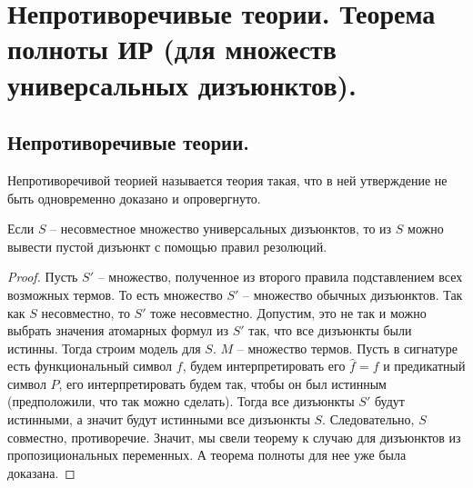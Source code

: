 \section{Непротиворечивые теории. Теорема полноты ИР (для множеств универсальных дизъюнктов).}

\subsection{Непротиворечивые теории.}

\begin{definition}
  Непротиворечивой теорией называется теория такая, что в ней утверждение не быть одновременно доказано и опровергнуто.
\end{definition}

\begin{theorem}
  Если $S$ -- несовместное множество универсальных дизъюнктов, то из $S$ можно вывести пустой дизъюнкт с помощью правил резолюций.
  \begin{proof}
    Пусть $S'$ -- множество, полученное из второго правила подставлением всех возможных термов. То есть множество $S'$ -- множество обычных дизъюнктов. Так как $S$ несовместно, то $S'$ тоже несовместно. Допустим, это не так и можно выбрать значения атомарных формул из $S'$ так, что все дизъюнкты были истинны. Тогда строим модель для $S$. $M$ -- множество термов. Пусть в сигнатуре есть функциональный символ $f$, будем интерпретировать его $\hat{f} = f$ и предикатный символ $P$, его интерпретировать будем так, чтобы он был истинным (предположили, что так можно сделать). Тогда все дизъюнкты $S'$ будут истинными, а значит будут истинными все дизъюнкты $S$. Следовательно, $S$ совместно, противоречие. Значит, мы свели теорему к случаю для дизъюнктов из пропозициональных переменных. А теорема полноты для нее уже была доказана.
  \end{proof}
\end{theorem}